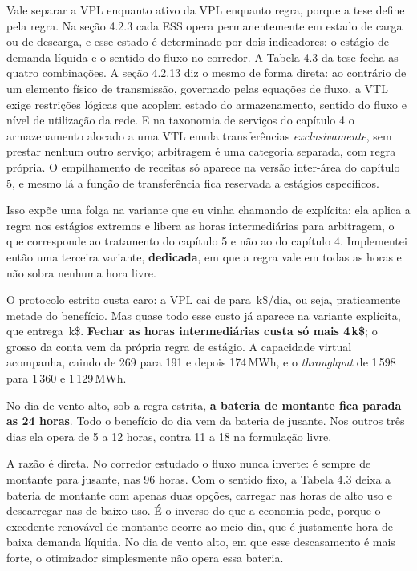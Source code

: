 \documentclass[11pt,a4paper]{article}
\begin{document}
Vale separar a VPL enquanto ativo da VPL enquanto regra, porque a tese define pela regra. Na seção 4.2.3
cada ESS opera permanentemente em estado de carga ou de descarga, e esse estado é determinado por dois
indicadores: o estágio de demanda líquida e o sentido do fluxo no corredor. A Tabela 4.3 da tese fecha as
quatro combinações. A seção 4.2.13 diz o mesmo de forma direta: ao contrário de um elemento físico de
transmissão, governado pelas equações de fluxo, a VTL exige restrições lógicas que acoplem estado do
armazenamento, sentido do fluxo e nível de utilização da rede. E na taxonomia de serviços do capítulo 4 o
armazenamento alocado a uma VTL emula transferências \emph{exclusivamente}, sem prestar nenhum outro
serviço; arbitragem é uma categoria separada, com regra própria. O empilhamento de receitas só aparece na
versão inter-área do capítulo 5, e mesmo lá a função de transferência fica reservada a estágios
específicos.

Isso expõe uma folga na variante que eu vinha chamando de explícita: ela aplica a regra nos estágios
extremos e libera as horas intermediárias para arbitragem, o que corresponde ao tratamento do capítulo 5 e
não ao do capítulo 4. Implementei então uma terceira variante, \textbf{dedicada}, em que a regra vale em
todas as horas e não sobra nenhuma hora livre.

\begin{table}[htbp]
\centering\small
\caption{As três leituras da VPL: benefício e interação (k\$/dia, médias dos quatro dias).}
\tableituras
\end{table}

O protocolo estrito custa caro: a VPL cai de \numdBemerg{} para \numdBdedic{}\,k\$/dia, ou seja,
praticamente metade do benefício. Mas quase todo esse custo já aparece na variante explícita, que entrega
\numdBexplic{}\,k\$. \textbf{Fechar as horas intermediárias custa só mais 4\,k\$}; o grosso da conta vem da
própria regra de estágio. A capacidade virtual acompanha, caindo de 269 para 191 e depois 174\,MWh, e o
\emph{throughput} de 1\,598 para 1\,360 e 1\,129\,MWh.

No dia de vento alto, sob a regra estrita, \textbf{a bateria de montante fica parada as 24
horas}. Todo o benefício do dia vem da bateria de jusante. Nos outros três dias ela opera de 5 a 12 horas,
contra 11 a 18 na formulação livre.

A razão é direta. No corredor estudado o fluxo nunca inverte: é sempre de montante para jusante, nas 96
horas. Com o sentido fixo, a Tabela 4.3 deixa a bateria de montante com apenas duas opções, carregar nas
horas de alto uso e descarregar nas de baixo uso. É o inverso do que a economia pede, porque o excedente
renovável de montante ocorre ao meio-dia, que é justamente hora de baixa demanda líquida. No dia de vento
alto, em que esse descasamento é mais forte, o otimizador simplesmente não opera essa bateria.
\end{document}
